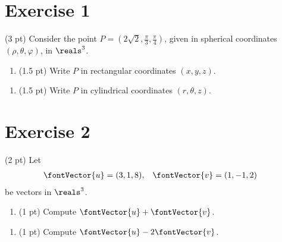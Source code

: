 \section{Exercise 1}

(3 pt) Consider the point $P = (2 \sqrt{2},\frac{\pi}{3},\frac{\pi}{4})$, given in spherical coordinates $(\rho,\theta,\varphi)$, in $\reals^{3}$.
\begin{enumerate}[label=(\alph*)]
\item (1.5 pt) Write $P$ in rectangular coordinates $(x,y,z)$. 
\end{enumerate}

\spaceSolution{1in}{}



\begin{enumerate}[resume,label=(\alph*)]
\item (1.5 pt) Write $P$ in cylindrical coordinates $(r,\theta,z)$.
\end{enumerate}

\spaceSolution{1in}{}





\section{Exercise 2}

(2 pt) Let
\begin{align*}
\fontVector{u}
&=
(3,1,8),
&
\fontVector{v}
&=
(1,-1,2)
\end{align*}
be vectors in $\reals^{3}$. 
\begin{enumerate}[label=(\alph*)]
\item (1 pt) Compute $\fontVector{u} + \fontVector{v}$.
\end{enumerate}

\spaceSolution{.75in}{}



\begin{enumerate}[resume,label=(\alph*)]
\item (1 pt) Compute $\fontVector{u} - 2 \fontVector{v}$.
\end{enumerate}

\spaceSolution{.75in}{}